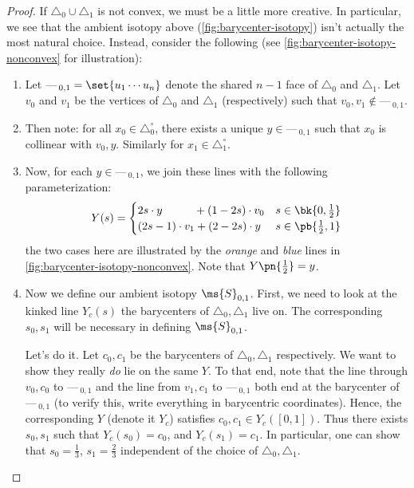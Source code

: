 \begin{proof}
  If $\triangle_0 \cup \triangle_1$ is not convex, we must be a
  little more creative. In particular, we see that the ambient
  isotopy above (\cref{fig:barycenter-isotopy}) isn't actually the
  most natural choice. Instead, consider the following (see
  \cref{fig:barycenter-isotopy-nonconvex} for illustration):
  \begin{enumerate}[label=\arabic*)]\newcommand{\temd}{\text{---}\,}
    \item Let $\temd_{0,1} = \set{u_1 \cdots u_{n}}$ denote the
      shared $n-1$ face of $\triangle_0$ and $\triangle_1$. Let
      $v_0$ and $v_1$ be the vertices of $\triangle_0$ and
      $\triangle_1$ (respectively) such that $v_0, v_1 \not\in
      \temd_{0,1}$.
    \item Then note: for all $x_0 \in \triangle_0^\circ$, there
      exists a unique $y \in \temd_{0,1}$ such that $x_0$ is
      collinear with $v_0, y$. Similarly for $x_1 \in
      \triangle_1^\circ$.
    \item Now, for each $y \in \temd_{0,1}$, we join these lines
      with the following parameterization:
      \[
      Y(s) =
      \begin{cases}
        2s \cdot y\qquad\,\,\,\,\, + (1 - 2s)\cdot v_0 & s \in \bk{0, \frac{1}{2}}
        \\
        (2s - 1) \cdot v_1 + (2 - 2s)\cdot y & s \in \pb{\frac{1}{2}, 1}
      \end{cases}
      \]
      the two cases here are illustrated by the \emph{orange} and
      \emph{blue} lines in
      \cref{fig:barycenter-isotopy-nonconvex}. Note that
      $Y\pn{\frac{1}{2}} = y$. %
    \item Now we define our ambient isotopy $\ms{S}_{0,1}$. First,
      we need to look at the kinked line $Y_c(s)$ the barycenters
      of $\triangle_0, \triangle_1$ live on. The corresponding
      $s_0, s_1$ will be necessary in defining $\ms{S}_{0,1}$.


      Let's do it. Let $c_0, c_1$ be the barycenters of $\triangle_0,
      \triangle_1$ respectively. We want to show they really \emph{do}
      lie on the same $Y$. To that end, note that the line through
      $v_0, c_0$ to $\temd_{0,1}$ and the line from $v_1, c_1$ to
      $\temd_{0,1}$ both end at the barycenter of $\temd_{0,1}$ (to
      verify this, write everything in barycentric coordinates).
      Hence, the corresponding $Y$ (denote it $Y_c$) satisfies $c_0,
      c_1 \in Y_c([0,1])$. Thus there exists $s_0, s_1$ such that
      $Y_c(s_0) = c_0$, and $Y_c(s_1) = c_1$. In particular, one can
      show that $s_0 = \frac{1}{3}$, $s_1 = \frac{2}{3}$ independent
      of the choice of $\triangle_0, \triangle_1$.


\end{enumerate}
\end{proof}
